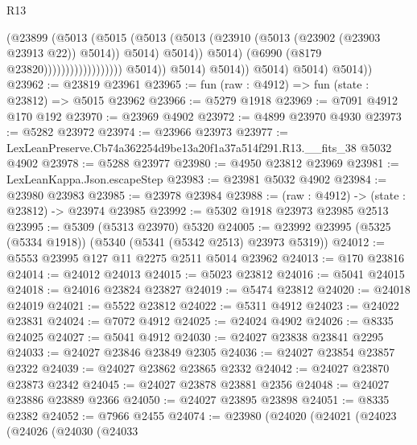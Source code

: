 \begin{lexlean}{R13}
\begin{coremodule}
                                                    (@23899
                                                      (@5013
                                                        (@5015
                                                          (@5013
                                                            (@5013
                                                              (@23910
                                                                (@5013
                                                                  (@23902 (@23903 @23913 @22))
                                                                  @5014))
                                                              @5014)
                                                            @5014))
                                                        @5014)
                                                      (@6990 (@8179 @23820))))))))))))))))))
                      @5014))
                  @5014)
                @5014))
            @5014)
          @5014)
        @5014))
@23962 := @23819 @23961
@23965 := fun (raw : @4912) => fun (state : @23812) => @5015 @23962
@23966 := @5279 @1918
@23969 := @7091 @4912 @170 @192
@23970 := @23969 @4902
@23972 := @4899 @23970 @4930
@23973 := @5282 @23972
@23974 := @23966 @23973
@23977 := LexLeanPreserve.Cb74a362254d9be13a20f1a37a514f291.R13.__fits_38 @5032 @4902
@23978 := @5288 @23977
@23980 := @4950 @23812 @23969
@23981 := LexLeanKappa.Json.escapeStep
@23983 := @23981 @5032 @4902
@23984 := @23980 @23983
@23985 := @23978 @23984
@23988 := (raw : @4912) -> (state : @23812) -> @23974 @23985
@23992 := @5302 @1918 @23973 @23985 @2513
@23995 := @5309 (@5313 @23970) @5320
@24005 := @23992 @23995 (@5325 (@5334 @1918)) (@5340 (@5341 (@5342 @2513) @23973 @5319))
@24012 := @5553 @23995 @127 @11 @2275 @2511 @5014 @23962
@24013 := @170 @23816
@24014 := @24012 @24013
@24015 := @5023 @23812
@24016 := @5041 @24015
@24018 := @24016 @23824 @23827
@24019 := @5474 @23812
@24020 := @24018 @24019
@24021 := @5522 @23812
@24022 := @5311 @4912
@24023 := @24022 @23831
@24024 := @7072 @4912
@24025 := @24024 @4902
@24026 := @8335 @24025
@24027 := @5041 @4912
@24030 := @24027 @23838 @23841 @2295
@24033 := @24027 @23846 @23849 @2305
@24036 := @24027 @23854 @23857 @2322
@24039 := @24027 @23862 @23865 @2332
@24042 := @24027 @23870 @23873 @2342
@24045 := @24027 @23878 @23881 @2356
@24048 := @24027 @23886 @23889 @2366
@24050 := @24027 @23895 @23898
@24051 := @8335 @2382
@24052 := @7966 @2455
@24074 := @23980
    (@24020
      (@24021
        (@24023
          (@24026
            (@24030
              (@24033

\end{coremodule}
\end{lexlean}
